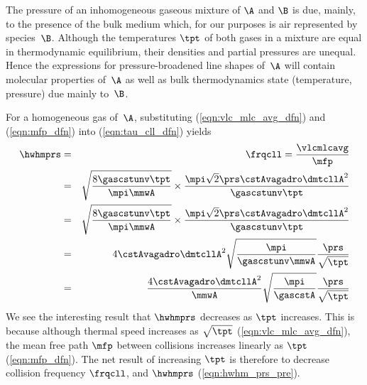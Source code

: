 \documentclass[12pt]{article}
\begin{document}
The pressure of an inhomogeneous gaseous mixture of $\A$ and $\B$ is
due, mainly, to the presence of the bulk medium which, for our
purposes is air represented by species~$\B$. 
Although the temperatures $\tpt$ of both gases in a mixture are equal  
in thermodynamic equilibrium, their densities and partial pressures
are unequal.
Hence the expressions for pressure-broadened line shapes of~$\A$ will
contain molecular properties of~$\A$ as well as bulk thermodynamics 
state (temperature, pressure) due mainly to~$\B$. 

For a homogeneous gas of~$\A$, substituting
(\ref{eqn:vlc_mlc_avg_dfn}) and (\ref{eqn:mfp_dfn}) into
(\ref{eqn:tau_cll_dfn}) yields
\begin{eqnarray}
\hwhmprs & = & \frqcll = \frac{\vlcmlcavg}{\mfp} \nonumber \\
& = & \sqrt{\frac{8 \gascstunv \tpt}{\mpi \mmwA}} \times
\frac{\mpi \sqrt{2} \prs \cstAvagadro \dmtcllA^{2}}{\gascstunv \tpt} \nonumber \\
& = & \sqrt{\frac{8 \gascstunv \tpt}{\mpi \mmwA}} \times
\frac{\mpi \sqrt{2} \prs \cstAvagadro \dmtcllA^{2}}{\gascstunv \tpt} \nonumber \\
& = & 4 \cstAvagadro \dmtcllA^{2} \sqrt{\frac{\mpi}{\gascstunv \mmwA}}
\frac{\prs}{\sqrt{\tpt}} \nonumber \\
& = & \frac{4 \cstAvagadro \dmtcllA^{2}}{\mmwA}
\sqrt{\frac{\mpi}{\gascstA}} \frac{\prs}{\sqrt{\tpt}}
\label{eqn:hwhm_prs_pre}
\end{eqnarray}
We see the interesting result that $\hwhmprs$ decreases as $\tpt$ increases.
This is because although thermal speed increases as $\sqrt{\tpt}$
(\ref{eqn:vlc_mlc_avg_dfn}), the mean free path $\mfp$ between
collisions increases linearly as $\tpt$ (\ref{eqn:mfp_dfn}).
The net result of increasing $\tpt$ is therefore to decrease collision
frequency $\frqcll$, and $\hwhmprs$ (\ref{eqn:hwhm_prs_pre}).
\end{document}
